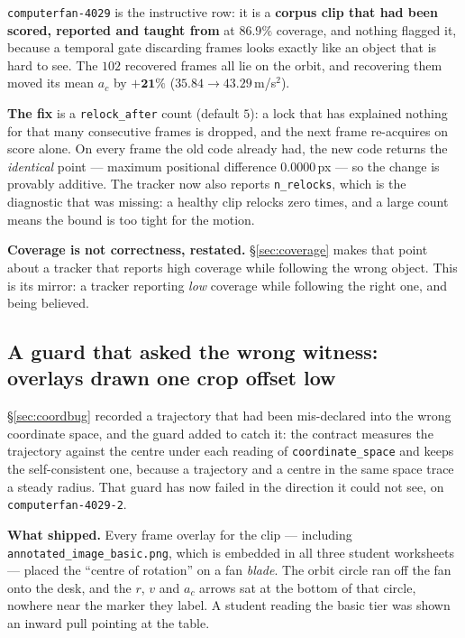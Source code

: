 \documentclass[11pt,a4paper]{article}
\begin{document}
\texttt{computerfan-4029} is the instructive row: it is a \textbf{corpus clip that had been
scored, reported and taught from} at $86.9\%$ coverage, and nothing flagged it, because a
temporal gate discarding frames looks exactly like an object that is hard to see. The $102$
recovered frames all lie on the orbit, and recovering them moved its mean $a_c$ by
$\mathbf{+21\%}$ ($35.84 \to 43.29$\,m/s$^2$).

\textbf{The fix} is a \texttt{relock\_after} count (default $5$): a lock that has explained
nothing for that many consecutive frames is dropped, and the next frame re-acquires on score
alone. On every frame the old code already had, the new code returns the \emph{identical} point
--- maximum positional difference $0.0000$\,px --- so the change is provably additive. The tracker
now also reports \texttt{n\_relocks}, which is the diagnostic that was missing: a healthy clip
relocks zero times, and a large count means the bound is too tight for the motion.

\textbf{Coverage is not correctness, restated.} \S\ref{sec:coverage} makes that point about a
tracker that reports high coverage while following the wrong object. This is its mirror: a
tracker reporting \emph{low} coverage while following the right one, and being believed.

\subsection{A guard that asked the wrong witness: overlays drawn one crop offset low}
\label{sec:cropbounds}

\S\ref{sec:coordbug} recorded a trajectory that had been mis-declared into the wrong coordinate
space, and the guard added to catch it: the contract measures the trajectory against the centre
under each reading of \texttt{coordinate\_space} and keeps the self-consistent one, because a
trajectory and a centre in the same space trace a steady radius. That guard has now failed in the
direction it could not see, on \texttt{computerfan-4029-2}.

\textbf{What shipped.} Every frame overlay for the clip --- including
\texttt{annotated\_image\_basic.png}, which is embedded in all three student worksheets --- placed
the ``centre of rotation'' on a fan \emph{blade}. The orbit circle ran off the fan onto the desk,
and the $r$, $v$ and $a_c$ arrows sat at the bottom of that circle, nowhere near the marker they
label. A student reading the basic tier was shown an inward pull pointing at the table.
\end{document}

